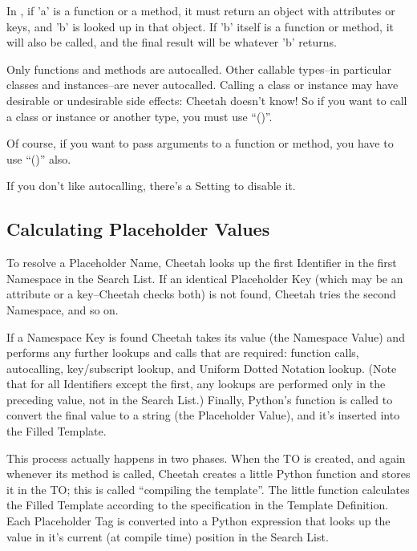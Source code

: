 In , if 'a' is a function or a method, it must return an object
with attributes or keys, and 'b' is looked up in that object.  If 'b'
itself is a function or method, it will also be called, and the final result
will be whatever 'b' returns.

Only functions and methods are autocalled.  Other callable types--in particular
classes and instances--are never autocalled.  Calling a class or instance may
have desirable or undesirable side effects: Cheetah doesn't know!  So if you 
want to call a class or instance or another type, you must use ``()''.

Of course, if you want to pass arguments to a function or method, you have to
use ``()'' also.

If you don't like autocalling, there's a Setting to disable it.


\subsection{Calculating Placeholder Values}

To resolve a Placeholder Name, Cheetah looks up the first Identifier in the
first Namespace in the Search List.  If an identical Placeholder Key (which may
be an attribute or a key--Cheetah checks both) is not found, Cheetah tries the
second Namespace, and so on.

If a Namespace Key is found Cheetah takes its value (the Namespace Value) and
performs any further lookups and calls that are required: function calls,
autocalling, key/subscript lookup, and Uniform Dotted Notation lookup.  (Note
that for all Identifiers except the first, any lookups are performed only in
the preceding value, not in the Search List.) Finally, Python's 
function is called to convert the final value to a string (the Placeholder
Value), and it's inserted into the Filled Template.

This process actually happens in two phases.  When the TO is created, and again
whenever its  method is called, Cheetah creates a little
Python function and stores it in the TO; this is called ``compiling the 
template''.  The little function calculates the Filled Template according to the
specification in the Template Definition.  Each Placeholder Tag is converted
into a Python expression that looks up the value in it's current (at compile
time) position in the Search List.

